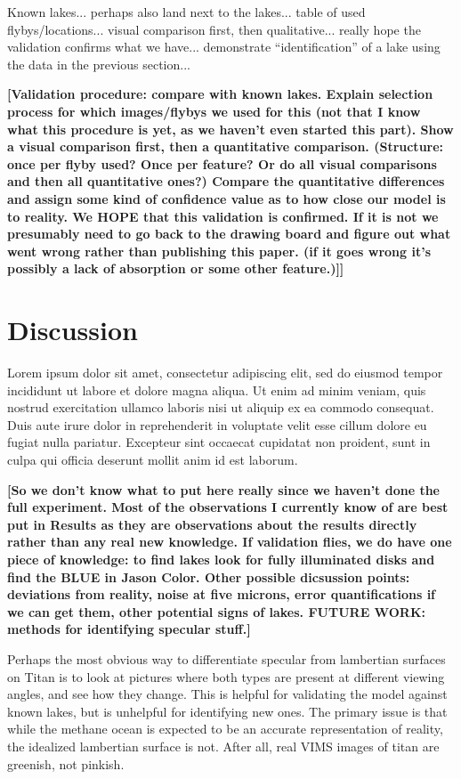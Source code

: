 \documentclass[linenumbers]{aastex631}
\begin{document}
\color{Green}Known lakes... perhaps also land next to the lakes... table of used flybys/locations... visual comparison first, then qualitative... really hope the validation confirms what we have... demonstrate ``identification'' of a lake using the data in the previous section... \color{black}

\textbf{\color{red}[Validation procedure: compare with known lakes. Explain selection process for which images/flybys we used for this (not that I know what this procedure is yet, as we haven't even started this part). Show a visual comparison first, then a quantitative comparison. (Structure: once per flyby used? Once per feature? Or do all visual comparisons and then all quantitative ones?) Compare the quantitative differences and assign some kind of confidence value as to how close our model is to reality. We HOPE that this validation is confirmed. If it is not we presumably need to go back to the drawing board and figure out what went wrong rather than publishing this paper. (if it goes wrong it's possibly a lack of absorption or some other feature.)]]\color{black}}

\section{Discussion}
Lorem ipsum dolor sit amet, consectetur adipiscing elit, sed do eiusmod tempor incididunt ut labore et dolore magna aliqua. Ut enim ad minim veniam, quis nostrud exercitation ullamco laboris nisi ut aliquip ex ea commodo consequat. Duis aute irure dolor in reprehenderit in voluptate velit esse cillum dolore eu fugiat nulla pariatur. Excepteur sint occaecat cupidatat non proident, sunt in culpa qui officia deserunt mollit anim id est laborum.

\textbf{\color{red}[So we don't know what to put here really since we haven't done the full experiment. Most of the observations I currently know of are best put in Results as they are observations about the results directly rather than any real new knowledge. If validation flies, we do have one piece of knowledge: to find lakes look for fully illuminated disks and find the BLUE in Jason Color. Other possible dicsussion points: deviations from reality, noise at five microns, error quantifications if we can get them, other potential signs of lakes. FUTURE WORK: methods for identifying specular stuff.]
\color{black}}

Perhaps the most obvious way to differentiate specular from lambertian surfaces on Titan is to look at pictures where both types are present at different viewing angles, and see how they change. This is helpful for validating the model against known lakes, but is unhelpful for identifying new ones. The primary issue is that while the methane ocean is expected to be an accurate representation of reality, the idealized lambertian surface is not. After all, real VIMS images of titan are greenish, not pinkish. 
\end{document}
